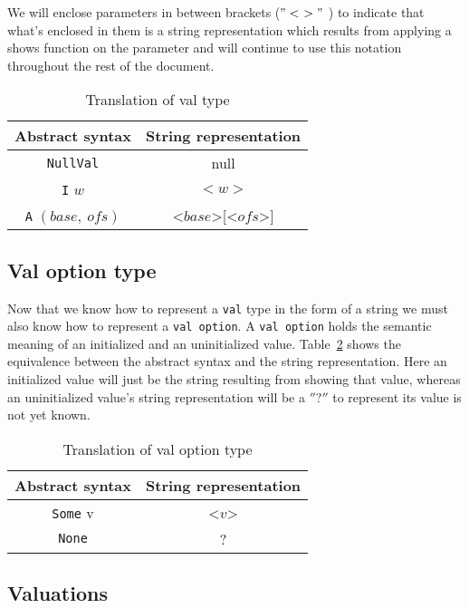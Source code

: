 We will enclose parameters in between brackets ($"<\ >"$ ) to indicate that what's enclosed in them is a string representation which results from applying a shows function on the parameter and will continue to use this notation throughout the rest of the document.

\begin{table}[h!]
\centering
\begin{tabular}{|c|c|}
  \hline
  \textbf{Abstract syntax} & \textbf{String representation} \\ [0.5ex]
  \hline \hline
  \verb|NullVal| & null \\
  \verb|I| $w$ & $<w>$ \\
  \verb|A| $(base,\ ofs)$ & <$base$>[<$ofs$>] \\
  \hline
\end{tabular}

\caption{Translation of val type}
\label{tab:pretty_val}
\end{table}

\subsection{Val option type}\label{subsection:pretty_val_option_type}

Now that we know how to represent a \verb|val| type in the form of a string we must also know how to represent a \verb|val option|.
A \verb|val option| holds the semantic meaning of an initialized and an uninitialized value.
Table~\ref{tab:pretty_val_option} shows the equivalence between the abstract syntax and the string representation.
Here an initialized value will just be the string resulting from showing that value, whereas an uninitialized value's string representation will be a $''?''$ to represent its value is not yet known.

\begin{table}[h!]
\centering
\begin{tabular}{|c|c|}
  \hline
  \textbf{Abstract syntax} & \textbf{String representation} \\ [0.5ex]
  \hline \hline
  \verb|Some| v & <$v$> \\
  \verb|None| & ? \\
  \hline
\end{tabular}

\caption{Translation of val option type}
\label{tab:pretty_val_option}
\end{table}


\subsection{Valuations}\label{subsection:pretty_valuations}

